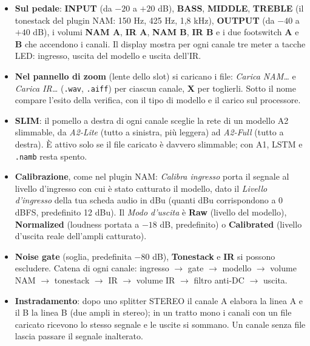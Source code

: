 \documentclass[11pt,a4paper]{article}
\newcommand{\ctl}[1]{\textbf{\textsf{#1}}}
\begin{document}
\begin{itemize}
  \item \textbf{Sul pedale}: \ctl{INPUT} (da $-20$ a $+20$ dB), \ctl{BASS}, \ctl{MIDDLE}, \ctl{TREBLE}
        (il tonestack del plugin NAM: 150 Hz, 425 Hz, 1{,}8 kHz), \ctl{OUTPUT} (da $-40$ a $+40$ dB),
        i volumi \ctl{NAM A}, \ctl{IR A}, \ctl{NAM B}, \ctl{IR B} e i due footswitch \textbf{A} e \textbf{B}
        che accendono i canali. Il display mostra per ogni canale tre meter a tacche LED: ingresso,
        uscita del modello e uscita dell'IR.
  \item \textbf{Nel pannello di zoom} (lente dello slot) si caricano i file: \emph{Carica NAM\dots} e
        \emph{Carica IR\dots} (\texttt{.wav}, \texttt{.aiff}) per ciascun canale, \textbf{X} per toglierli.
        Sotto il nome compare l'esito della verifica, con il tipo di modello e il carico sul processore.
  \item \textbf{SLIM}: il pomello a destra di ogni canale sceglie la rete di un modello A2 slimmable,
        da \emph{A2-Lite} (tutto a sinistra, più leggera) ad \emph{A2-Full} (tutto a destra). È attivo
        solo se il file caricato è davvero slimmable; con A1, LSTM e \texttt{.namb} resta spento.
  \item \textbf{Calibrazione}, come nel plugin NAM: \emph{Calibra ingresso} porta il segnale al livello
        d'ingresso con cui è stato catturato il modello, dato il \emph{Livello d'ingresso} della tua
        scheda audio in dBu (quanti dBu corrispondono a 0 dBFS, predefinito 12 dBu). Il \emph{Modo
        d'uscita} è \textbf{Raw} (livello del modello), \textbf{Normalized} (loudness portata a $-18$ dB,
        predefinito) o \textbf{Calibrated} (livello d'uscita reale dell'ampli catturato).
  \item \textbf{Noise gate} (soglia, predefinita $-80$ dB), \textbf{Tonestack} e \textbf{IR} si possono
        escludere. Catena di ogni canale: ingresso $\rightarrow$ gate $\rightarrow$ modello $\rightarrow$
        volume NAM $\rightarrow$ tonestack $\rightarrow$ IR $\rightarrow$ volume IR $\rightarrow$ filtro
        anti-DC $\rightarrow$ uscita.
  \item \textbf{Instradamento}: dopo uno splitter STEREO il canale A elabora la linea A e il B la
        linea B (due ampli in stereo); in un tratto mono i canali con un file caricato ricevono lo
        stesso segnale e le uscite si sommano. Un canale senza file lascia passare il segnale inalterato.
\end{itemize}
\end{document}
